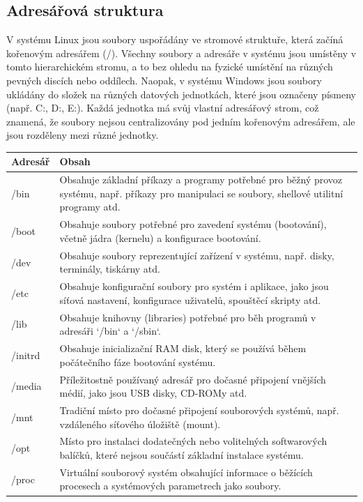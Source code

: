 \subsection{Adresářová struktura}
V systému Linux jsou soubory uspořádány ve stromové struktuře, která začíná kořenovým adresářem (/). Všechny soubory a adresáře v systému jsou umístěny v tomto hierarchickém stromu, a to bez ohledu na fyzické umístění na různých pevných discích nebo oddílech.
Naopak, v systému Windows jsou soubory ukládány do složek na různých datových jednotkách, které jsou označeny písmeny (např. C:, D:, E:). Každá jednotka má svůj vlastní adresářový strom, což znamená, že soubory nejsou centralizovány pod jedním kořenovým adresářem, ale jsou rozděleny mezi různé jednotky.
\begin{center}
\begin{tabular}{|l|p{10cm}|}
 \hline
 \textbf{Adresář}  & \textbf{Obsah} \\
 \hline
 /bin     & Obsahuje základní příkazy a programy potřebné pro běžný provoz systému, např. příkazy pro manipulaci se soubory, shellové utilitní programy atd. \\
 \hline
 /boot    & Obsahuje soubory potřebné pro zavedení systému (bootování), včetně jádra (kernelu) a konfigurace bootování. \\
 \hline
 /dev     & Obsahuje soubory reprezentující zařízení v systému, např. disky, terminály, tiskárny atd. \\
 \hline
 /etc     & Obsahuje konfigurační soubory pro systém i aplikace, jako jsou síťová nastavení, konfigurace uživatelů, spouštěcí skripty atd. \\
 \hline
 /lib     & Obsahuje knihovny (libraries) potřebné pro běh programů v adresáři `/bin` a `/sbin`. \\
 \hline
 /initrd  & Obsahuje inicializační RAM disk, který se používá během počátečního fáze bootování systému. \\
 \hline
 /media   & Příležitostně používaný adresář pro dočasné připojení vnějších médií, jako jsou USB disky, CD-ROMy atd. \\
 \hline
 /mnt     & Tradiční místo pro dočasné připojení souborových systémů, např. vzdáleného síťového úložiště (mount). \\
 \hline
 /opt     & Místo pro instalaci dodatečných nebo volitelných softwarových balíčků, které nejsou součástí základní instalace systému. \\
 \hline
 /proc    & Virtuální souborový systém obsahující informace o běžících procesech a systémových parametrech jako soubory. \\

\end{tabular}
\end{center}
